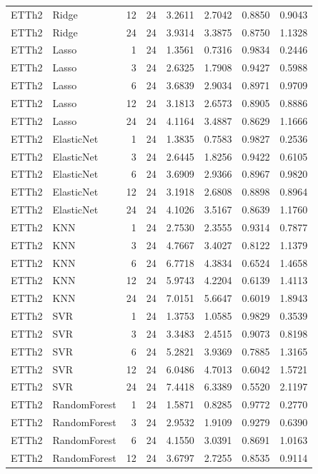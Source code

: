 \begin{tabular}{llrrrrrr}
ETTh2 & Ridge & 12 & 24 & 3.2611 & 2.7042 & 0.8850 & 0.9043 \\
ETTh2 & Ridge & 24 & 24 & 3.9314 & 3.3875 & 0.8750 & 1.1328 \\
ETTh2 & Lasso & 1 & 24 & 1.3561 & 0.7316 & 0.9834 & 0.2446 \\
ETTh2 & Lasso & 3 & 24 & 2.6325 & 1.7908 & 0.9427 & 0.5988 \\
ETTh2 & Lasso & 6 & 24 & 3.6839 & 2.9034 & 0.8971 & 0.9709 \\
ETTh2 & Lasso & 12 & 24 & 3.1813 & 2.6573 & 0.8905 & 0.8886 \\
ETTh2 & Lasso & 24 & 24 & 4.1164 & 3.4887 & 0.8629 & 1.1666 \\
ETTh2 & ElasticNet & 1 & 24 & 1.3835 & 0.7583 & 0.9827 & 0.2536 \\
ETTh2 & ElasticNet & 3 & 24 & 2.6445 & 1.8256 & 0.9422 & 0.6105 \\
ETTh2 & ElasticNet & 6 & 24 & 3.6909 & 2.9366 & 0.8967 & 0.9820 \\
ETTh2 & ElasticNet & 12 & 24 & 3.1918 & 2.6808 & 0.8898 & 0.8964 \\
ETTh2 & ElasticNet & 24 & 24 & 4.1026 & 3.5167 & 0.8639 & 1.1760 \\
ETTh2 & KNN & 1 & 24 & 2.7530 & 2.3555 & 0.9314 & 0.7877 \\
ETTh2 & KNN & 3 & 24 & 4.7667 & 3.4027 & 0.8122 & 1.1379 \\
ETTh2 & KNN & 6 & 24 & 6.7718 & 4.3834 & 0.6524 & 1.4658 \\
ETTh2 & KNN & 12 & 24 & 5.9743 & 4.2204 & 0.6139 & 1.4113 \\
ETTh2 & KNN & 24 & 24 & 7.0151 & 5.6647 & 0.6019 & 1.8943 \\
ETTh2 & SVR & 1 & 24 & 1.3753 & 1.0585 & 0.9829 & 0.3539 \\
ETTh2 & SVR & 3 & 24 & 3.3483 & 2.4515 & 0.9073 & 0.8198 \\
ETTh2 & SVR & 6 & 24 & 5.2821 & 3.9369 & 0.7885 & 1.3165 \\
ETTh2 & SVR & 12 & 24 & 6.0486 & 4.7013 & 0.6042 & 1.5721 \\
ETTh2 & SVR & 24 & 24 & 7.4418 & 6.3389 & 0.5520 & 2.1197 \\
ETTh2 & RandomForest & 1 & 24 & 1.5871 & 0.8285 & 0.9772 & 0.2770 \\
ETTh2 & RandomForest & 3 & 24 & 2.9532 & 1.9109 & 0.9279 & 0.6390 \\
ETTh2 & RandomForest & 6 & 24 & 4.1550 & 3.0391 & 0.8691 & 1.0163 \\
ETTh2 & RandomForest & 12 & 24 & 3.6797 & 2.7255 & 0.8535 & 0.9114 \\

\end{tabular}
